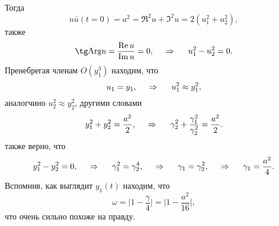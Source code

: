 Тогда
\begin{equation*}
    u \bar{u} (t=0) = a^2 = \Re^2 u + \Im^2 u = 2 (u_1^2 + u_2^2),
\end{equation*}
также
\begin{equation*}
    \tg \text{Arg} u = \frac{\Re u}{\Im u} = 0,
    \hspace{0.5cm} \Rightarrow \hspace{0.5cm}
    u_1^2 - u_2^2 = 0.
\end{equation*}
Пренебрегая членам $O(y_1^3)$ находим, что
\begin{equation*}
    u_1 = y_1,
    \hspace{0.5cm} \Rightarrow \hspace{0.5cm}
    u_1^2 \approx y_1^2,
\end{equation*}
аналогчино $u_2^2 \approx y_2^2$, другими словами
\begin{equation*}
    y_1^2 + y_2^2 = \frac{a^2}{2},
    \hspace{0.5cm} \Rightarrow \hspace{0.5cm}
    \gamma_2^2 + \frac{\gamma_1^2}{\gamma_2^2} = \frac{a^2}{2}.
\end{equation*}
также верно, что
\begin{equation*}
    y_1^2 - y_2^2 = 0,
    \hspace{0.5cm} \Rightarrow \hspace{0.5cm}   
    \gamma_1^2 = \gamma_2^4,
    \hspace{0.5cm} \Rightarrow \hspace{0.5cm}
    \gamma_1 = \gamma_2^2,
    \hspace{0.5cm} \Rightarrow \hspace{0.5cm}
    \gamma_1 = \frac{a^2}{4}.
\end{equation*}
Вспомнив, как выглядит $y_1 (t)$ находим, что
\begin{equation*}
    \omega = \bigg|1-\frac{\gamma}{4}\bigg| = \bigg|
    1 - \frac{a^2}{16}
    \bigg|,
\end{equation*}
что очень сильно похоже на правду.
